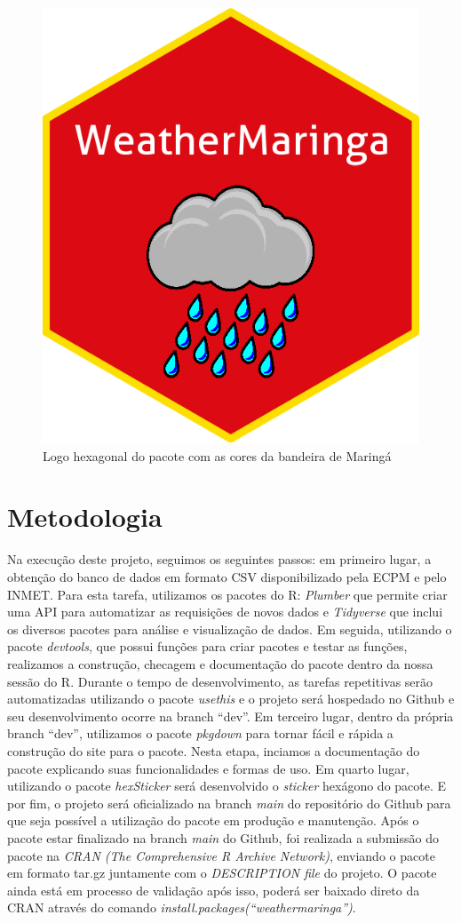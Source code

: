 \documentclass[final]{beamer}
\begin{document}
\begin{frame}[t]
\begin{multicols}{2}
\begin{figure}
\centering
\includegraphics[width=0.40\columnwidth]{hexlogo.png}
\caption{Logo hexagonal do pacote com as cores da bandeira de Maringá}
\end{figure}




\section{Metodologia}

Na execução deste projeto, seguimos os seguintes passos: em primeiro lugar, a obtenção do banco de  dados em formato CSV disponibilizado pela ECPM e pelo INMET. Para esta tarefa, utilizamos os pacotes do R:  \textit{Plumber} que permite criar uma API para automatizar as requisições de novos dados e   \textit{Tidyverse}  que inclui os diversos pacotes para análise e visualização de dados. Em seguida, utilizando o pacote  \textit{devtools}, que possui funções para criar pacotes e testar as funções, realizamos a construção, checagem e documentação do pacote dentro da nossa sessão do R. Durante o tempo de desenvolvimento, as tarefas repetitivas serão automatizadas utilizando o pacote  \textit{usethis} e o projeto será hospedado no Github e seu desenvolvimento ocorre na branch “dev”. Em terceiro lugar, dentro da própria branch “dev”, utilizamos o pacote  \textit{pkgdown} para tornar fácil e rápida a construção do site para o pacote. Nesta etapa, inciamos a documentação do pacote explicando suas funcionalidades e formas de uso. Em quarto lugar, utilizando o pacote  \textit{hexSticker} será desenvolvido o  \textit{sticker} hexágono do pacote. E por fim, o projeto será oficializado na branch  \textit{main} do repositório do Github para que seja possível a utilização do pacote em produção e manutenção. 
Após o pacote estar finalizado na branch  \textit{main} do Github, foi realizada a  submissão do pacote na  \textit{CRAN (The Comprehensive R Archive Network)}, enviando o pacote em formato tar.gz juntamente com o  \textit{DESCRIPTION file} do projeto. O pacote ainda está em processo de validação após isso, poderá ser baixado direto da CRAN através do comando  \textit{install.packages(“weathermaringa”)}.



\end{multicols}
\end{frame}
\end{document}
